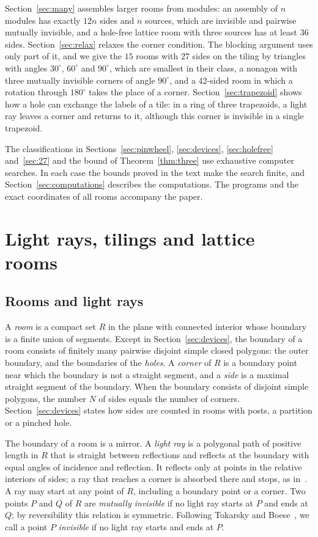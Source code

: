 \documentclass[11pt,a4paper]{article}
\theoremstyle{plain}
\theoremstyle{definition}
\theoremstyle{remark}
\newcommand{\dg}{^\circ}
\numberwithin{equation}{section}
\begin{document}
Section~\ref{sec:many} assembles larger rooms from modules: an assembly of $n$ modules has exactly $12n$ sides and $n$ sources, which are invisible and pairwise mutually invisible, and a hole-free lattice room with three sources has at least $36$ sides. Section~\ref{sec:relax} relaxes the corner condition. The blocking argument uses only part of it, and we give the $15$ rooms with $27$ sides on the tiling by triangles with angles $30\dg$, $60\dg$ and $90\dg$, which are smallest in their class, a nonagon with three mutually invisible corners of angle $90\dg$, and a 42-sided room in which a rotation through $180\dg$ takes the place of a corner. Section~\ref{sec:trapezoid} shows how a hole can exchange the labels of a tile: in a ring of three trapezoids, a light ray leaves a corner and returns to it, although this corner is invisible in a single trapezoid.

The classifications in Sections~\ref{sec:pinwheel}, \ref{sec:devices}, \ref{sec:holefree} and~\ref{sec:27} and the bound of Theorem~\ref{thm:three} use exhaustive computer searches. In each case the bounds proved in the text make the search finite, and Section~\ref{sec:computations} describes the computations. The programs and the exact coordinates of all rooms accompany the paper.

\section{Light rays, tilings and lattice rooms}\label{sec:prelim}

\subsection{Rooms and light rays}
A \emph{room} is a compact set $R$ in the plane with connected interior whose boundary is a finite union of segments. Except in Section~\ref{sec:devices}, the boundary of a room consists of finitely many pairwise disjoint simple closed polygons: the outer boundary, and the boundaries of the \emph{holes}. A \emph{corner} of $R$ is a boundary point near which the boundary is not a straight segment, and a \emph{side} is a maximal straight segment of the boundary. When the boundary consists of disjoint simple polygons, the number $N$ of sides equals the number of corners. Section~\ref{sec:devices} states how sides are counted in rooms with posts, a partition or a pinched hole.

The boundary of a room is a mirror. A \emph{light ray} is a polygonal path of positive length in $R$ that is straight between reflections and reflects at the boundary with equal angles of incidence and reflection. It reflects only at points in the relative interiors of sides; a ray that reaches a corner is absorbed there and stops, as in~\cite{Klee,Tok95}. A ray may start at any point of $R$, including a boundary point or a corner. Two points $P$ and $Q$ of $R$ are \emph{mutually invisible} if no light ray starts at $P$ and ends at $Q$; by reversibility this relation is symmetric. Following Tokarsky and Boese~\cite{TB}, we call a point $P$ \emph{invisible} if no light ray starts and ends at $P$.
\end{document}
